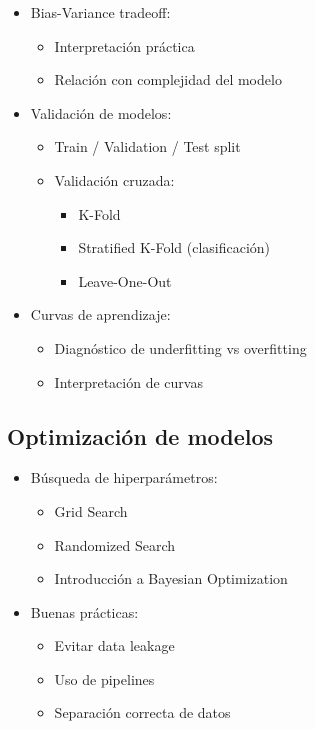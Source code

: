 \documentclass[12pt,a4paper,openany,oneside]{book}
\begin{document}
\begin{itemize}
\begin{itemize}
    \item Bias-Variance tradeoff:
    \begin{itemize}
        \item Interpretación práctica
        \item Relación con complejidad del modelo
    \end{itemize}

    \item Validación de modelos:
    \begin{itemize}
        \item Train / Validation / Test split
        \item Validación cruzada:
        \begin{itemize}
            \item K-Fold
            \item Stratified K-Fold (clasificación)
            \item Leave-One-Out
        \end{itemize}
    \end{itemize}

    \item Curvas de aprendizaje:
    \begin{itemize}
        \item Diagnóstico de underfitting vs overfitting
        \item Interpretación de curvas
    \end{itemize}
\end{itemize}

\subsection{Optimización de modelos}
\begin{itemize}
    \item Búsqueda de hiperparámetros:
    \begin{itemize}
        \item Grid Search
        \item Randomized Search
        \item Introducción a Bayesian Optimization
    \end{itemize}
    
    \item Buenas prácticas:
    \begin{itemize}
        \item Evitar data leakage
        \item Uso de pipelines
        \item Separación correcta de datos
    \end{itemize}
\end{itemize}


\end{itemize}
\end{document}
